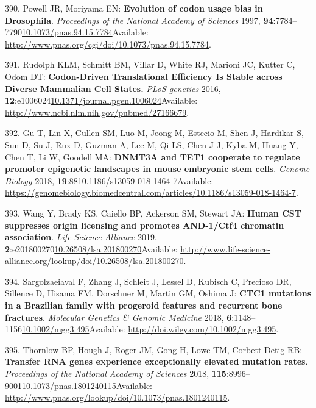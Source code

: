 \documentclass[
]{book}
\begin{document}
\leavevmode\hypertarget{ref-Powell1997}{}%
390. Powell JR, Moriyama EN: \textbf{Evolution of codon usage bias in Drosophila}. \emph{Proceedings of the National Academy of Sciences} 1997, \textbf{94}:7784--7790\href{https://doi.org/10.1073/pnas.94.15.7784}{10.1073/pnas.94.15.7784}Available: \url{http://www.pnas.org/cgi/doi/10.1073/pnas.94.15.7784}.

\leavevmode\hypertarget{ref-Rudolph2016}{}%
391. Rudolph KLM, Schmitt BM, Villar D, White RJ, Marioni JC, Kutter C, Odom DT: \textbf{Codon-Driven Translational Efficiency Is Stable across Diverse Mammalian Cell States.} \emph{PLoS genetics} 2016, \textbf{12}:e1006024\href{https://doi.org/10.1371/journal.pgen.1006024}{10.1371/journal.pgen.1006024}Available: \url{http://www.ncbi.nlm.nih.gov/pubmed/27166679}.

\leavevmode\hypertarget{ref-Gu2018}{}%
392. Gu T, Lin X, Cullen SM, Luo M, Jeong M, Estecio M, Shen J, Hardikar S, Sun D, Su J, Rux D, Guzman A, Lee M, Qi LS, Chen J-J, Kyba M, Huang Y, Chen T, Li W, Goodell MA: \textbf{DNMT3A and TET1 cooperate to regulate promoter epigenetic landscapes in mouse embryonic stem cells}. \emph{Genome Biology} 2018, \textbf{19}:88\href{https://doi.org/10.1186/s13059-018-1464-7}{10.1186/s13059-018-1464-7}Available: \url{https://genomebiology.biomedcentral.com/articles/10.1186/s13059-018-1464-7}.

\leavevmode\hypertarget{ref-Wang2019a}{}%
393. Wang Y, Brady KS, Caiello BP, Ackerson SM, Stewart JA: \textbf{Human CST suppresses origin licensing and promotes AND-1/Ctf4 chromatin association}. \emph{Life Science Alliance} 2019, \textbf{2}:e201800270\href{https://doi.org/10.26508/lsa.201800270}{10.26508/lsa.201800270}Available: \url{http://www.life-science-alliance.org/lookup/doi/10.26508/lsa.201800270}.

\leavevmode\hypertarget{ref-Sargolzaeiaval2018}{}%
394. Sargolzaeiaval F, Zhang J, Schleit J, Lessel D, Kubisch C, Precioso DR, Sillence D, Hisama FM, Dorschner M, Martin GM, Oshima J: \textbf{CTC1 mutations in a Brazilian family with progeroid features and recurrent bone fractures}. \emph{Molecular Genetics \& Genomic Medicine} 2018, \textbf{6}:1148--1156\href{https://doi.org/10.1002/mgg3.495}{10.1002/mgg3.495}Available: \url{http://doi.wiley.com/10.1002/mgg3.495}.

\leavevmode\hypertarget{ref-Thornlow2018}{}%
395. Thornlow BP, Hough J, Roger JM, Gong H, Lowe TM, Corbett-Detig RB: \textbf{Transfer RNA genes experience exceptionally elevated mutation rates}. \emph{Proceedings of the National Academy of Sciences} 2018, \textbf{115}:8996--9001\href{https://doi.org/10.1073/pnas.1801240115}{10.1073/pnas.1801240115}Available: \url{http://www.pnas.org/lookup/doi/10.1073/pnas.1801240115}.
\end{document}
